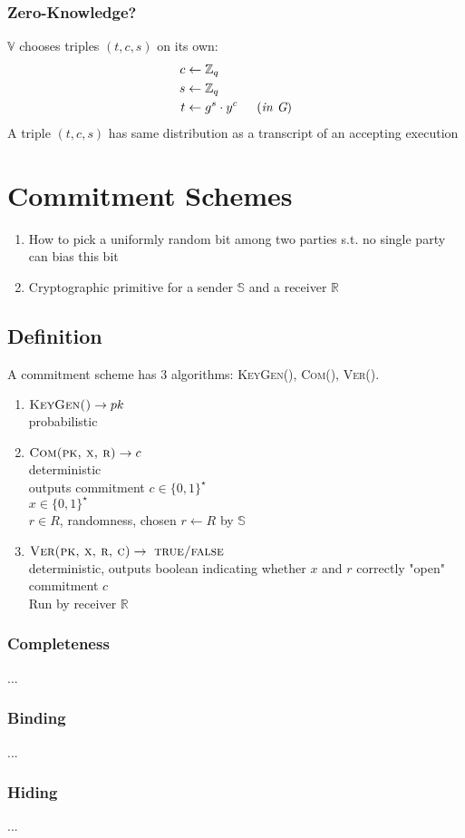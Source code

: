 \documentclass{report}
\begin{document}
			\subsubsection{Zero-Knowledge?}
			\subsectionstart
				$\mathbb{V}$ chooses triples $(t,c,s)$ on its own:
				\begin{align*}
					c & \leftarrow \mathbb{Z}_q \\
					s & \leftarrow \mathbb{Z}_q \\
					t & \leftarrow g^s \cdot y^c \indent (\textit{in G})\\
				\end{align*}
				A triple $(t,c,s)$ has same distribution as a transcript of an accepting execution
			\sectionend
		\sectionend
	\sectionend
	
	\section{Commitment Schemes}
	\sectionstart
		\begin{enumerate}[-]
			\item How to pick a uniformly random bit among two parties s.t. no single party can bias this bit
			\item Cryptographic primitive for a sender $\mathbb{S}$ and a receiver $\mathbb{R}$
		\end{enumerate}
		\subsection{Definition}
		\subsectionstart
			A commitment scheme has 3 algorithms: \textsc{KeyGen()}, \textsc{Com()}, \textsc{Ver()}.
			\begin{enumerate}
				\item $\textsc{KeyGen()} \rightarrow pk$ \\
				\indent probabilistic
				\item $\textsc{Com(pk, x, r)} \rightarrow c$ \\
				\indent deterministic \\
				\indent outputs commitment $c \in \{ 0,1 \} ^{\star}$ \\
				\indent $x \in \{ 0,1 \} ^{\star}$ \\
				\indent $r \in R$, randomness, chosen $r \leftarrow R$ by $\mathbb{S}$
				\item $\textsc{Ver(pk, x, r, c)} \rightarrow \ \textsc{true/false}$ \\
				\indent deterministic, outputs boolean indicating whether $x$ and $r$ correctly "open" commitment $c$ \\
				\indent Run by receiver $\mathbb{R}$
			\end{enumerate}
			\subsubsection{Completeness}
			\subsectionstart
				...
			\sectionend
			\subsubsection{Binding}
			\subsectionstart
				...
			\sectionend
			\subsubsection{Hiding}
			\subsectionstart
				...
			\sectionend
		\sectionend
	\sectionend
\end{document}
